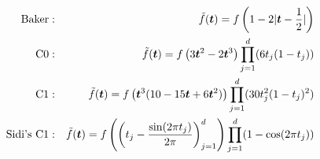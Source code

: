 \documentclass[handout, 10pt,compress,xcolor={usenames,dvipsnames}]{beamer} %
\newcommand{\bm}[1]{\boldsymbol{#1}}
\newcommand{\MLE}{\textup{EB}}
\newcommand{\vthetaMLE}{{\vtheta}_{\MLE}}
\renewcommand{\vtheta}{{\bm{\theta}}}
\begin{document}

\iffalse
\begin{align*}
\text{Baker} & : & \tilde{f}(\boldsymbol{t})
= f\left(1-2|\boldsymbol{t}-\frac{1}{2}| \right)
\\
\text{C0} & : & \tilde{f}(\boldsymbol{t})
= f\left(3\boldsymbol{t}^2 - 2\boldsymbol{t}^3\right)\prod_{j=1}^d(6t_j(1-t_j))
\\
\text{C1} & : & \tilde{f}(\boldsymbol{t})
= f\left(\boldsymbol{t}^3(10-15\boldsymbol{t}+6\boldsymbol{t}^2)\right)\prod_{j=1}^d(30t_j^2(1-t_j)^2)
\\
\text{Sidi's C1} & : & \tilde{f}(\boldsymbol{t})
= f\left( \left( t_j- \frac{\sin(2\pi t_j)}{2\pi} \right)_{j=1}^d \right)\prod_{j=1}^d(1-\cos(2\pi t_j))
\end{align*}

\end{document}
